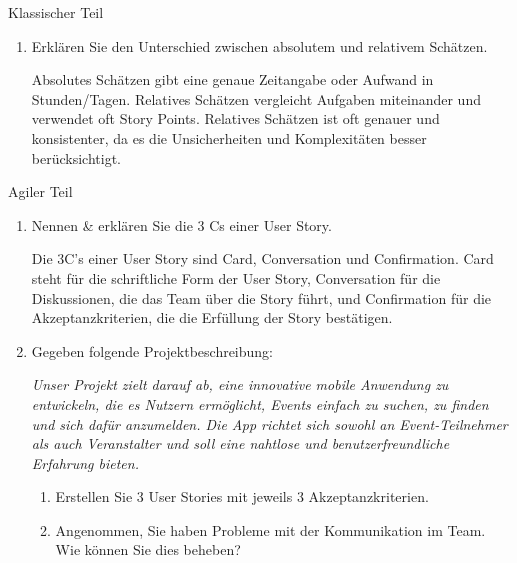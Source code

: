 \documentclass{article}
\begin{document}
\begin{exercise}{Klassischer Teil}
\begin{enumerate}
    \item Erklären Sie den Unterschied zwischen absolutem und relativem Schätzen.

          \begin{solution}
            Absolutes Schätzen gibt eine genaue Zeitangabe oder Aufwand in Stunden/Tagen. Relatives Schätzen vergleicht Aufgaben miteinander und verwendet oft Story Points. Relatives Schätzen ist oft genauer und konsistenter, da es die Unsicherheiten und Komplexitäten besser berücksichtigt.
          \end{solution}
  \end{enumerate}
\end{exercise}

\begin{exercise}{Agiler Teil}
  \begin{enumerate}
    \item Nennen \& erklären Sie die 3 Cs einer User Story.

          \begin{solution}
            Die 3C's einer User Story sind Card, Conversation und Confirmation. Card steht für die schriftliche Form der User Story, Conversation für die Diskussionen, die das Team über die Story führt, und Confirmation für die Akzeptanzkriterien, die die Erfüllung der Story bestätigen.
          \end{solution}

    \item Gegeben folgende Projektbeschreibung:
          \par \textit{Unser Projekt zielt darauf ab, eine innovative mobile Anwendung zu entwickeln, die es Nutzern ermöglicht, Events einfach zu suchen, zu finden und sich dafür anzumelden. Die App richtet sich sowohl an Event-Teilnehmer als auch Veranstalter und soll eine nahtlose und benutzerfreundliche Erfahrung bieten.}
          \begin{enumerate}
            \item Erstellen Sie 3 User Stories mit jeweils 3 Akzeptanzkriterien.
            \item Angenommen, Sie haben Probleme mit der Kommunikation im Team. Wie können Sie dies beheben?
          \end{enumerate}


\end{enumerate}
\end{exercise}
\end{document}
